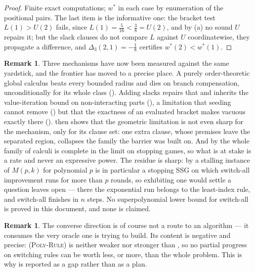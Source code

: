 \documentclass[11pt]{article}
\theoremstyle{plain}
\theoremstyle{definition}
\newtheorem{remark}[theorem]{Remark}
\begin{document}
\begin{proof}
Finite exact computations; $w^\ast$ in each case by enumeration of the
positional pairs. The last item is the informative one: the bracket test
$L(1)>U(2)$ fails, since $L(1)=\tfrac5{16}<\tfrac38=U(2)$, and by
(a) no sound $U$ repairs it; but the slack clauses do
not compare $L$ against $U$ coordinatewise, they propagate a difference,
and $\Delta_3(2,1)=-\tfrac18$ certifies $w^\ast(2)<w^\ast(1)$.
\end{proof}

\begin{remark}\label{rem:frontier-moved}
Three mechanisms have now been measured against the same yardstick, and
the frontier has moved to a precise place. A purely order-theoretic
global calculus beats every bounded radius and dies on branch
compensation, unconditionally for its whole class
(). Adding slacks repairs that and inherits
the value-iteration bound on non-interacting parts
(), a limitation that seeding cannot remove
() but that the exactness of an evaluated
bracket makes vacuous exactly there ().
 then shows that the geometric limitation is not
even sharp for the mechanism, only for its clause set: one extra clause,
whose premises leave the separated region, collapses the family the
barrier was built on. And by  the whole family
of calculi is complete in the limit on stopping games, so what is at
stake is a rate and never an expressive power.
The residue is sharp: by  a stalling instance of
$M(p,k)$ for polynomial $p$ is in particular a stopping SSG on which
switch-all improvement runs for more than $p$ rounds, so exhibiting one
would settle a question  leaves open --- there the
exponential run belongs to the least-index rule, and switch-all finishes
in $n$ steps. No superpolynomial lower bound for switch-all is proved in
this document, and none is claimed.
\end{remark}








\begin{remark}
The converse direction is of course not a route to an algorithm --- it
consumes the very oracle one is trying to build. Its content is
negative and precise: \textsc{(Poly-Rule)} is neither weaker nor
stronger than , so no partial progress on switching rules
can be worth less, or more, than the whole problem. This is why
 is reported as a gap rather than as a plan.
\end{remark}
\end{document}
